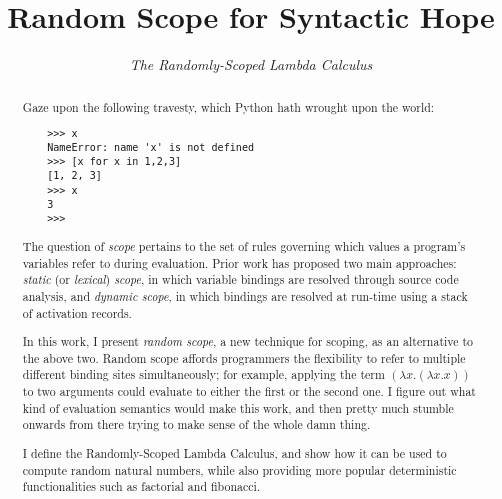 \documentclass[10pt]{sigplanconf}
\begin{document}
\copyrightdata{}


\title{
Random Scope for Syntactic Hope
}
\subtitle{\em The Randomly-Scoped Lambda Calculus}



\maketitle

\begin{abstract}

Gaze upon the following travesty, which Python hath wrought upon the world:
\begin{verbatim}
    >>> x
    NameError: name 'x' is not defined
    >>> [x for x in 1,2,3]
    [1, 2, 3]
    >>> x
    3
    >>>
\end{verbatim}

The question of {\em scope} pertains to the set of rules governing which values a program's variables refer to during evaluation.
Prior work has proposed two main approaches: {\em static} (or {\em lexical}) {\em scope}, in which variable bindings are resolved through source code analysis, and {\em dynamic scope}, in which bindings are resolved at run-time using a stack of activation records.

In this work, I present {\em random scope}, a new technique for scoping, as an alternative to the above two.
Random scope affords programmers the flexibility to refer to multiple different binding sites simultaneously; for example, applying the term $(\lambda x. (\lambda x. x))$ to two arguments could evaluate to either the first or the second one.
I figure out what kind of evaluation semantics would make this work, and then pretty much stumble onwards from there trying to make sense of the whole damn thing.

I define the Randomly-Scoped Lambda Calculus, and show how it can be used to compute random natural numbers, while also providing more popular deterministic functionalities such as factorial and fibonacci.

\end{abstract}
\end{document}
